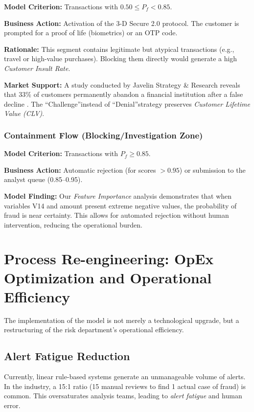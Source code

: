 \documentclass[12pt,a4paper]{report}
\begin{document}
\textbf{Model Criterion:} Transactions with \(0.50 \le P_f < 0.85\).  

\textbf{Business Action:} Activation of the 3-D Secure 2.0 protocol. The customer is prompted for a proof of life (biometrics) or an OTP code.  

\textbf{Rationale:} This segment contains legitimate but atypical transactions (e.g., travel or high-value purchases). Blocking them directly would generate a high \textit{Customer Insult Rate}.

\textbf{Market Support:} A study conducted by Javelin Strategy \& Research reveals that 33\% of customers permanently abandon a financial institution after a false decline \cite{javelin2023a}. The \textquotedblleft Challenge\textquotedblright instead of \textquotedblleft Denial\textquotedblright strategy preserves \textit{Customer Lifetime Value (CLV)}.

\subsubsection{Containment Flow (Blocking/Investigation Zone)}

\textbf{Model Criterion:} Transactions with \(P_f \ge 0.85\).  

\textbf{Business Action:} Automatic rejection (for scores \(> 0.95\)) or submission to the analyst queue (0.85--0.95).  

\textbf{Model Finding:} Our \textit{Feature Importance} analysis demonstrates that when variables V14 and amount present extreme negative values, the probability of fraud is near certainty. This allows for automated rejection without human intervention, reducing the operational burden.

\section{Process Re-engineering: OpEx Optimization and Operational Efficiency}

The implementation of the model is not merely a technological upgrade, but a restructuring of the risk department's operational efficiency.




\subsection{Alert Fatigue Reduction}

Currently, linear rule-based systems generate an unmanageable volume of alerts. In the industry, a 15:1 ratio (15 manual reviews to find 1 actual case of fraud) is common. This oversaturates analysis teams, leading to \textit{alert fatigue} and human error.
\end{document}

